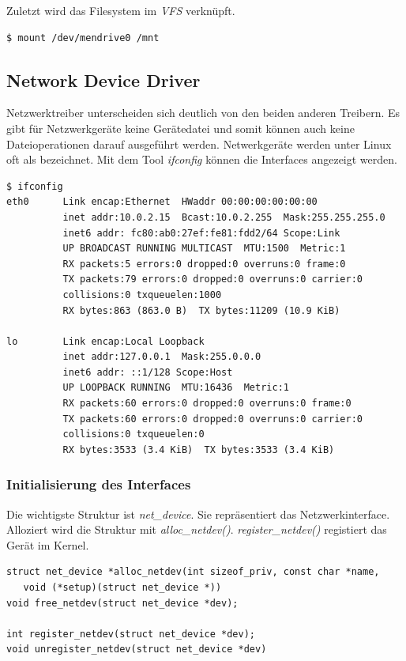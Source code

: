 Zuletzt wird das Filesystem im \emph{VFS} verknüpft.
\begin{lstlisting}
$ mount /dev/mendrive0 /mnt
\end{lstlisting} 

\subsection{Network Device Driver}

Netzwerktreiber unterscheiden sich deutlich von den beiden anderen Treibern. Es gibt für Netzwerkgeräte keine Gerätedatei und somit können auch keine Dateioperationen
darauf ausgeführt werden. Netwerkgeräte werden unter Linux oft als  bezeichnet. Mit dem Tool \emph{ifconfig} können die Interfaces
angezeigt werden.

\begin{lstlisting}
$ ifconfig
eth0      Link encap:Ethernet  HWaddr 00:00:00:00:00:00  
          inet addr:10.0.2.15  Bcast:10.0.2.255  Mask:255.255.255.0
          inet6 addr: fc80:ab0:27ef:fe81:fdd2/64 Scope:Link
          UP BROADCAST RUNNING MULTICAST  MTU:1500  Metric:1
          RX packets:5 errors:0 dropped:0 overruns:0 frame:0
          TX packets:79 errors:0 dropped:0 overruns:0 carrier:0
          collisions:0 txqueuelen:1000 
          RX bytes:863 (863.0 B)  TX bytes:11209 (10.9 KiB)

lo        Link encap:Local Loopback  
          inet addr:127.0.0.1  Mask:255.0.0.0
          inet6 addr: ::1/128 Scope:Host
          UP LOOPBACK RUNNING  MTU:16436  Metric:1
          RX packets:60 errors:0 dropped:0 overruns:0 frame:0
          TX packets:60 errors:0 dropped:0 overruns:0 carrier:0
          collisions:0 txqueuelen:0 
          RX bytes:3533 (3.4 KiB)  TX bytes:3533 (3.4 KiB)
\end{lstlisting}

\subsubsection{Initialisierung des Interfaces}

Die wichtigste Struktur ist \emph{net\_device}. Sie repräsentiert das Netzwerkinterface. Alloziert wird die Struktur mit \emph{alloc\_netdev()}.
\emph{register\_netdev()} registiert das Gerät im Kernel.

\begin{lstlisting}[caption=Network Device Initialisation]
struct net_device *alloc_netdev(int sizeof_priv, const char *name, 
   void (*setup)(struct net_device *))
void free_netdev(struct net_device *dev);

int register_netdev(struct net_device *dev);
void unregister_netdev(struct net_device *dev)
\end{lstlisting}

